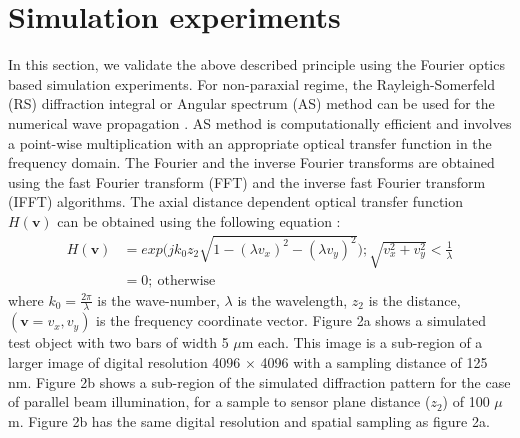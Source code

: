 \documentclass[journal]{IEEEtran}
\begin{document}
\section{Simulation experiments}
In this section, we validate the above described principle using the Fourier optics based simulation experiments.  For non-paraxial regime, the Rayleigh-Somerfeld (RS) diffraction integral or Angular spectrum (AS) method can be used for the numerical wave propagation \cite{goodman2005introduction}. AS method is computationally efficient and involves a point-wise multiplication with an appropriate optical transfer function in the frequency domain. The Fourier and the inverse Fourier transforms are obtained using the fast Fourier transform (FFT) and the inverse fast Fourier transform (IFFT) algorithms. The axial distance dependent optical transfer function $H(\textbf{v})$ can be obtained using the following equation \cite{kumar2020compressive,ozcan2016lensless}:
\begin{align}
H(\textbf{v}) &=  exp\Big(jk_0z_2 \sqrt{1 - (\lambda v_x)^2-(\lambda v_y)^2}\Big);  \sqrt{v^2_x+v^2_y} < \frac{1}{\lambda} \\
&= 0;\ \textrm{otherwise}
\end{align}
where $k_0 = \frac{2\pi}{\lambda}$ is the wave-number, $\lambda$ is the wavelength, $z_2$ is the distance, $(\textbf{v}=v_x,v_y)$ is the frequency coordinate vector.
Figure 2a shows a simulated test object with two bars of width 5 $\mu$m each. This image is a sub-region of a larger image of digital resolution 4096 $\times$ 4096 with a sampling distance of 125 nm. Figure 2b shows a sub-region of the simulated diffraction pattern for the case of parallel beam illumination, for a sample to sensor plane distance ($z_2$) of 100 $\mu$m. Figure 2b has the same digital resolution and spatial sampling as figure 2a. 
\end{document}
